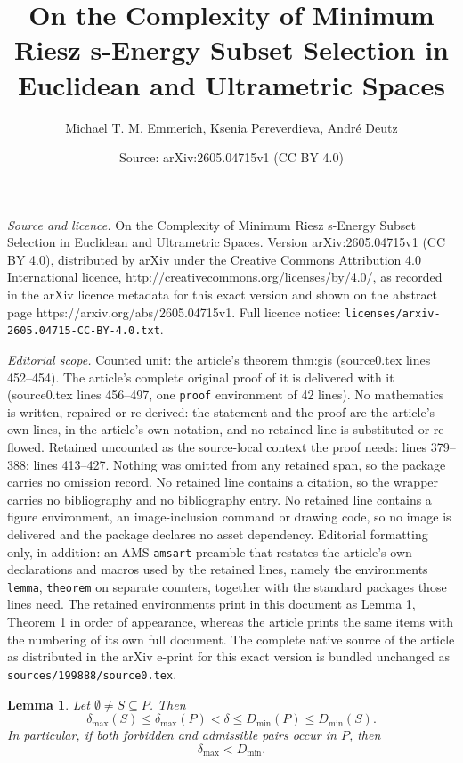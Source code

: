 \documentclass[10pt,a4paper]{amsart}
\title{On the Complexity of Minimum Riesz s-Energy Subset Selection in Euclidean and Ultrametric Spaces}
\author{Michael T. M. Emmerich, Ksenia Pereverdieva, Andr\'e Deutz}
\date{Source: arXiv:2605.04715v1 (CC BY 4.0)}
\newtheorem{lemma}{Lemma}
\begin{document}
\maketitle

\noindent\emph{Source and licence.} On the Complexity of Minimum Riesz s-Energy Subset Selection in Euclidean and Ultrametric Spaces. Version arXiv:2605.04715v1 (CC BY 4.0), distributed by arXiv under the Creative Commons Attribution 4.0 International licence, http://creativecommons.org/licenses/by/4.0/, as recorded in the arXiv licence metadata for this exact version and shown on the abstract page https://arxiv.org/abs/2605.04715v1. Full licence notice: \texttt{licenses/arxiv-2605.04715-CC-BY-4.0.txt}.\par\smallskip

\noindent\textit{Editorial scope.} Counted unit: the article's theorem thm:gis (source0.tex lines 452--454). The article's complete original proof of it is delivered with it (source0.tex lines 456--497, one \texttt{proof} environment of 42 lines). No mathematics is written, repaired or re-derived: the statement and the proof are the article's own lines, in the article's own notation, and no retained line is substituted or re-flowed.  Retained uncounted as the source-local context the proof needs: lines 379--388; lines 413--427.  Nothing was omitted from any retained span, so the package carries no omission record.  No retained line contains a citation, so the wrapper carries no bibliography and no bibliography entry.  No retained line contains a figure environment, an image-inclusion command or drawing code, so no image is delivered and the package declares no asset dependency.  Editorial formatting only, in addition: an AMS \texttt{amsart} preamble that restates the article's own declarations and macros used by the retained lines, namely the environments \texttt{lemma}, \texttt{theorem} on separate counters, together with the standard packages those lines need.  The retained environments print in this document as Lemma 1, Theorem 1 in order of appearance, whereas the article prints the same items with the numbering of its own full document.  The complete native source of the article as distributed in the arXiv e-print for this exact version is bundled unchanged as \texttt{sources/199888/source0.tex}.
\begin{lemma}\label{lem:dmin-dmax-monotone}
Let $\emptyset\neq S\subseteq P$. Then
\[
\delta_{\max}(S)\le \delta_{\max}(P)<\delta\le D_{\min}(P)\le D_{\min}(S).
\]
In particular, if both forbidden and admissible pairs occur in $P$, then
\[
\delta_{\max}<D_{\min}.
\]
\end{lemma}
\end{document}
